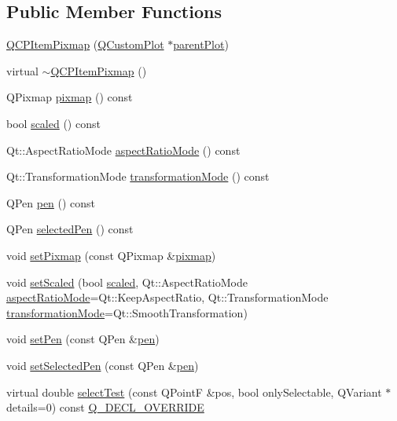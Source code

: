 \subsection*{Public Member Functions}
\begin{DoxyCompactItemize}
\item 
\mbox{\hyperlink{class_q_c_p_item_pixmap_aa6de42a37261b21a5480e7da122345c3}{Q\+C\+P\+Item\+Pixmap}} (\mbox{\hyperlink{class_q_custom_plot}{Q\+Custom\+Plot}} $\ast$\mbox{\hyperlink{class_q_c_p_layerable_a473edb813a4c1929d6b6a8fe3ff3faf7}{parent\+Plot}})
\item 
virtual \mbox{\hyperlink{class_q_c_p_item_pixmap_a810cac6a409d963cda6ea2d3152f1fd0}{$\sim$\+Q\+C\+P\+Item\+Pixmap}} ()
\item 
Q\+Pixmap \mbox{\hyperlink{class_q_c_p_item_pixmap_a7daef7e0c432902d69e7db3e0e217a1f}{pixmap}} () const
\item 
bool \mbox{\hyperlink{class_q_c_p_item_pixmap_a8768534b5f3080abfc007db198373327}{scaled}} () const
\item 
Qt\+::\+Aspect\+Ratio\+Mode \mbox{\hyperlink{class_q_c_p_item_pixmap_a662cbca12e6cdcd2a94b0b08879292fd}{aspect\+Ratio\+Mode}} () const
\item 
Qt\+::\+Transformation\+Mode \mbox{\hyperlink{class_q_c_p_item_pixmap_ab963aa9693d49c323948f2820a5785b6}{transformation\+Mode}} () const
\item 
Q\+Pen \mbox{\hyperlink{class_q_c_p_item_pixmap_a6ae9922eba6386a5ac4e2a569ec29e1f}{pen}} () const
\item 
Q\+Pen \mbox{\hyperlink{class_q_c_p_item_pixmap_a23806a20efcb172f0309e18809dc49d8}{selected\+Pen}} () const
\item 
void \mbox{\hyperlink{class_q_c_p_item_pixmap_a726b69ea4025edf48f9b29b6450548a7}{set\+Pixmap}} (const Q\+Pixmap \&\mbox{\hyperlink{class_q_c_p_item_pixmap_a7daef7e0c432902d69e7db3e0e217a1f}{pixmap}})
\item 
void \mbox{\hyperlink{class_q_c_p_item_pixmap_ab4d44529a1c6c8d37d0ea7560e042777}{set\+Scaled}} (bool \mbox{\hyperlink{class_q_c_p_item_pixmap_a8768534b5f3080abfc007db198373327}{scaled}}, Qt\+::\+Aspect\+Ratio\+Mode \mbox{\hyperlink{class_q_c_p_item_pixmap_a662cbca12e6cdcd2a94b0b08879292fd}{aspect\+Ratio\+Mode}}=Qt\+::\+Keep\+Aspect\+Ratio, Qt\+::\+Transformation\+Mode \mbox{\hyperlink{class_q_c_p_item_pixmap_ab963aa9693d49c323948f2820a5785b6}{transformation\+Mode}}=Qt\+::\+Smooth\+Transformation)
\item 
void \mbox{\hyperlink{class_q_c_p_item_pixmap_acdade1305edb4b5cae14f97fd132065f}{set\+Pen}} (const Q\+Pen \&\mbox{\hyperlink{class_q_c_p_item_pixmap_a6ae9922eba6386a5ac4e2a569ec29e1f}{pen}})
\item 
void \mbox{\hyperlink{class_q_c_p_item_pixmap_afc5e479e88e53740176ce77cb70dd67a}{set\+Selected\+Pen}} (const Q\+Pen \&\mbox{\hyperlink{class_q_c_p_item_pixmap_a6ae9922eba6386a5ac4e2a569ec29e1f}{pen}})
\item 
virtual double \mbox{\hyperlink{class_q_c_p_item_pixmap_a65d1ede7bb479b90d40186d083071947}{select\+Test}} (const Q\+PointF \&pos, bool only\+Selectable, Q\+Variant $\ast$details=0) const \mbox{\hyperlink{qcustomplot_8h_a42cc5eaeb25b85f8b52d2a4b94c56f55}{Q\+\_\+\+D\+E\+C\+L\+\_\+\+O\+V\+E\+R\+R\+I\+DE}}
\end{DoxyCompactItemize}

